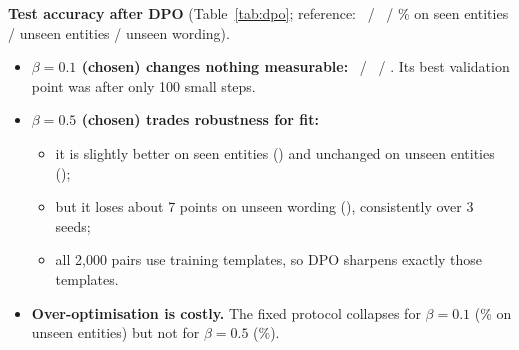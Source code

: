 \textbf{Test accuracy after DPO} (Table~\ref{tab:dpo}; reference: \AdaAccBestSeen\ / \AdaAccBestUnEnt\ / \AdaAccBestUnWord\% on seen entities / unseen entities / unseen wording).
\begin{itemize}[leftmargin=*,nosep]
\item \textbf{$\beta=0.1$ (chosen) changes nothing measurable:} \AdaDpoLowSeen\ / \AdaDpoLowUnEnt\ / \AdaDpoLowUnWord. Its best validation point was after only 100 small steps.
\item \textbf{$\beta=0.5$ (chosen) trades robustness for fit:}
\begin{itemize}[leftmargin=*,nosep]
\item it is slightly better on seen entities (\AdaDpoHighSeen) and unchanged on unseen entities (\AdaDpoHighUnEnt);
\item but it loses about 7 points on unseen wording (\AdaDpoHighUnWord), consistently over 3 seeds;
\item all 2,000 pairs use training templates, so DPO sharpens exactly those templates.
\end{itemize}
\item \textbf{Over-optimisation is costly.} The fixed protocol collapses for $\beta=0.1$ (\AdaFixLowUnEnt\% on unseen entities) but not for $\beta=0.5$ (\AdaFixHighUnEnt\%).
\end{itemize}

